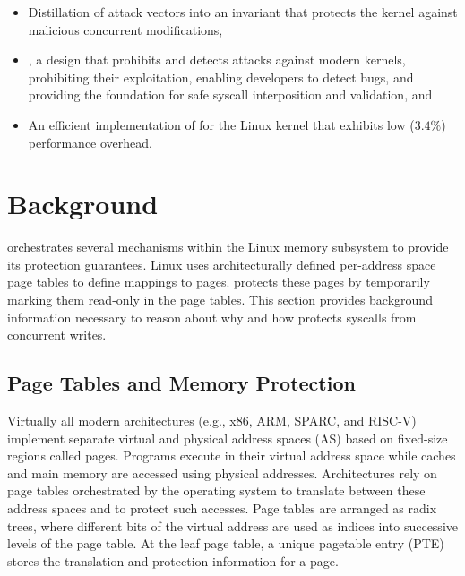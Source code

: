 \begin{itemize}[noitemsep]
\item Distillation of \tocttou attack vectors into an invariant that protects
the kernel against malicious concurrent modifications,
\item \midas, a design that prohibits and detects
\tocttou attacks against modern kernels, prohibiting their exploitation,
enabling developers to detect \tocttou bugs, and providing the foundation for
safe syscall interposition and validation, and
\item An efficient implementation of \midas for the Linux kernel that exhibits
low ($3.4\%$) performance overhead.
\end{itemize}


\section{Background}

\midas orchestrates several mechanisms within the Linux memory subsystem
to provide its protection guarantees.
Linux uses architecturally defined per-address space page tables to define
mappings to pages.
\midas protects these pages by temporarily marking them read-only in the
page tables.
This section provides background information necessary to reason about
why and how \midas protects syscalls from concurrent writes.


\subsection{Page Tables and Memory Protection}

Virtually all modern architectures (e.g., x86, ARM, SPARC, and
RISC-V) implement separate virtual and physical
address spaces (AS) based on fixed-size regions called pages.
%
%
Programs execute in their virtual address space while caches and main memory
are accessed using physical addresses.
Architectures rely on page tables orchestrated by the operating system
to translate between these address spaces and to protect such accesses.
Page tables are arranged as radix trees, where different bits of the
virtual address are used as indices into successive levels of the page table.
At the leaf page table, a unique pagetable entry (PTE) stores the
translation and protection information for a page.

